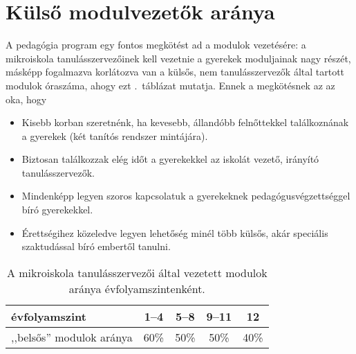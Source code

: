 \section{Külső modulvezetők aránya}
A pedagógia program egy fontos megkötést ad a modulok vezetésére: a mikroiskola tanulásszervezőinek kell vezetnie a gyerekek moduljainak nagy részét, másképp fogalmazva korlátozva van a külsős, nem tanulásszervezők által tartott modulok óraszáma, ahogy ezt .~táblázat mutatja.  Ennek a megkötésnek az az oka, hogy
\begin{itemize}
    \item Kisebb korban szeretnénk, ha kevesebb, állandóbb felnőttekkel találkoznának a gyerekek (két tanítós rendszer mintájára).
    \item Biztosan találkozzak elég időt a gyerekekkel az iskolát vezető, irányító tanulásszervezők.
    \item Mindenképp legyen szoros kapcsolatuk a gyerekeknek pedagógusvégzettséggel bíró gyerekekkel.
    \item Érettségihez közeledve legyen lehetőség minél több külsős, akár speciális szaktudással bíró embertől tanulni.
\end{itemize}

\begin{table}[ht]
    \begin{center}
    \begin{tabular}{l|c|c|c|c}
        évfolyamszint             & 1--4 & 5--8 & 9--11 & 12   \\ \hline
        ,,belsős'' modulok aránya & 60\% & 50\% & 50\%  & 40\%
    \end{tabular}
\end{center}
    \caption{A mikroiskola tanulásszervezői által vezetett modulok aránya évfolyamszintenként.}
    \label{tbl:belso_modulok}
\end{table}

